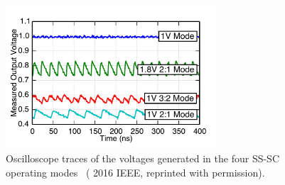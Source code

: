 \documentclass[graybox]{svmult}
\begin{document}
\begin{figure}
  \centering
  \includegraphics[width=0.7\textwidth]{6-raven3-dcdc-waveforms}
  \caption{Oscilloscope traces of the voltages generated in the four SS-SC operating modes~\cite{Zimmer2016} ({\textcopyright} 2016 IEEE, reprinted with permission).}
  \label{fig:6-raven3-dcdc-waveforms}
\end{figure}
\end{document}
